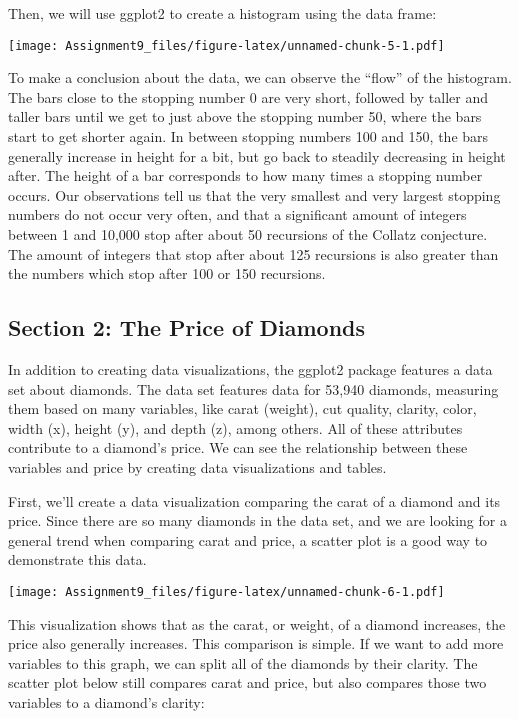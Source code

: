 \documentclass[
]{article}
\begin{document}
Then, we will use ggplot2 to create a histogram using the data frame:

\texttt{[image: Assignment9\_files/figure-latex/unnamed-chunk-5-1.pdf]}

To make a conclusion about the data, we can observe the ``flow'' of the
histogram. The bars close to the stopping number 0 are very short,
followed by taller and taller bars until we get to just above the
stopping number 50, where the bars start to get shorter again. In
between stopping numbers 100 and 150, the bars generally increase in
height for a bit, but go back to steadily decreasing in height after.
The height of a bar corresponds to how many times a stopping number
occurs. Our observations tell us that the very smallest and very largest
stopping numbers do not occur very often, and that a significant amount
of integers between 1 and 10,000 stop after about 50 recursions of the
Collatz conjecture. The amount of integers that stop after about 125
recursions is also greater than the numbers which stop after 100 or 150
recursions.

\hypertarget{section-2-the-price-of-diamonds}{%
\subsection{Section 2: The Price of
Diamonds}\label{section-2-the-price-of-diamonds}}

In addition to creating data visualizations, the ggplot2 package
features a data set about diamonds. The data set features data for
53,940 diamonds, measuring them based on many variables, like carat
(weight), cut quality, clarity, color, width (x), height (y), and depth
(z), among others. All of these attributes contribute to a diamond's
price. We can see the relationship between these variables and price by
creating data visualizations and tables.

First, we'll create a data visualization comparing the carat of a
diamond and its price. Since there are so many diamonds in the data set,
and we are looking for a general trend when comparing carat and price, a
scatter plot is a good way to demonstrate this data.

\texttt{[image: Assignment9\_files/figure-latex/unnamed-chunk-6-1.pdf]}

This visualization shows that as the carat, or weight, of a diamond
increases, the price also generally increases. This comparison is
simple. If we want to add more variables to this graph, we can split all
of the diamonds by their clarity. The scatter plot below still compares
carat and price, but also compares those two variables to a diamond's
clarity:
\end{document}
